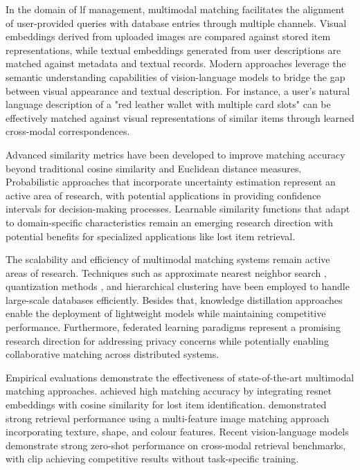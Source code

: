 In the domain of \ac{lf} management, multimodal matching facilitates the alignment of user-provided queries with database entries through multiple channels. Visual embeddings derived from uploaded images are compared against stored item representations, while textual embeddings generated from user descriptions are matched against metadata and textual records. Modern approaches leverage the semantic understanding capabilities of vision-language models to bridge the gap between visual appearance and textual description. For instance, a user's natural language description of a "red leather wallet with multiple card slots" can be effectively matched against visual representations of similar items through learned cross-modal correspondences.

Advanced similarity metrics have been developed to improve matching accuracy beyond traditional cosine similarity and Euclidean distance measures. Probabilistic approaches that incorporate uncertainty estimation represent an active area of research, with potential applications in providing confidence intervals for decision-making processes. Learnable similarity functions that adapt to domain-specific characteristics remain an emerging research direction with potential benefits for specialized applications like lost item retrieval.

The scalability and efficiency of multimodal matching systems remain active areas of research. Techniques such as approximate nearest neighbor search \cite{Johnson2019}, quantization methods \cite{Jegou2011}, and hierarchical clustering have been employed to handle large-scale databases efficiently. Besides that, knowledge distillation approaches \cite{Hinton2015} enable the deployment of lightweight models while maintaining competitive performance. Furthermore, federated learning paradigms \cite{Li2020Fed} represent a promising research direction for addressing privacy concerns while potentially enabling collaborative matching across distributed systems.

Empirical evaluations demonstrate the effectiveness of state-of-the-art multimodal matching approaches.  achieved high matching accuracy by integrating \ac{resnet} embeddings with cosine similarity for lost item identification.  demonstrated strong retrieval performance using a multi-feature image matching approach incorporating texture, shape, and colour features. Recent vision-language models demonstrate strong zero-shot performance on cross-modal retrieval benchmarks, with \ac{clip} achieving competitive results without task-specific training.

